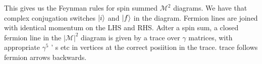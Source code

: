 This gives us the Feynman rules 
for spin summed $ \mathcal{ M } ^ 2 $ diagrams. 
We have that complex conjugation switches $ \ket{ i } $ and 
$ \ket{ f } $ in the diagram. 
Fermion lines are joined with identical momentum on the LHS and RHS. 
Adter a spin sum, a closed fermion line in the $| \mathcal{ M } | ^ 2 $ diagram 
is given by a trace over $ \gamma $ matrices, with appropriate $\gamma ^ 5 $ ' s
etc in vertices at the correct posiition in the trace. trace follows 
fermion arrows backwards. 
